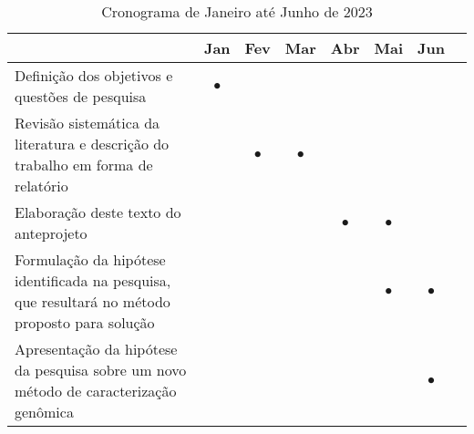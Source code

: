 \documentclass[font=plain]{abnt}
\begin{document}
\begin{table}[hb]
    \centering
    \begin{tabular}{ p{7.8cm} c c c c c c c }
        \toprule
         & Jan       & Fev       & Mar       & Abr       & Mai       & Jun       & \\
        \midrule
        Definição dos objetivos e questões de pesquisa
         & $\bullet$ &           &           &           &           &           & \\
        \midrule
        Revisão sistemática da literatura e descrição do trabalho em forma de relatório
         &           & $\bullet$ & $\bullet$ &           &           &           & \\
        \midrule
        Elaboração deste texto do anteprojeto
         &           &           &           & $\bullet$ & $\bullet$ &           & \\
        \midrule
        Formulação da hipótese identificada na pesquisa, que resultará no método proposto para solução
         &           &           &           &           & $\bullet$ & $\bullet$ & \\
        \midrule
        Apresentação da hipótese da pesquisa sobre um novo método de caracterização genômica
         &           &           &           &           &           & $\bullet$ & \\

        \bottomrule
    \end{tabular}
    \caption{Cronograma de Janeiro até Junho de 2023}~\label{tab:cronograma_tcc_i}
\end{table}
\end{document}
